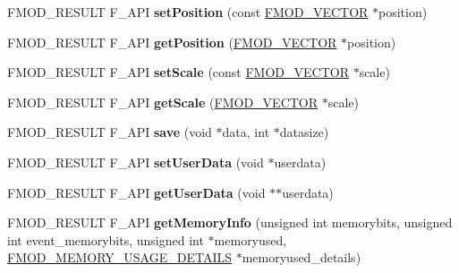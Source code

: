 \begin{DoxyCompactItemize}
\item 
F\+M\+O\+D\+\_\+\+R\+E\+S\+U\+LT F\+\_\+\+A\+PI {\bfseries set\+Position} (const \hyperlink{struct_f_m_o_d___v_e_c_t_o_r}{F\+M\+O\+D\+\_\+\+V\+E\+C\+T\+OR} $\ast$position)\hypertarget{class_f_m_o_d_1_1_geometry_a36ca90c62cbc0c37938a51750ce865e7}{}\label{class_f_m_o_d_1_1_geometry_a36ca90c62cbc0c37938a51750ce865e7}

\item 
F\+M\+O\+D\+\_\+\+R\+E\+S\+U\+LT F\+\_\+\+A\+PI {\bfseries get\+Position} (\hyperlink{struct_f_m_o_d___v_e_c_t_o_r}{F\+M\+O\+D\+\_\+\+V\+E\+C\+T\+OR} $\ast$position)\hypertarget{class_f_m_o_d_1_1_geometry_a2d0e4a6525b54cd9a39c447995eba296}{}\label{class_f_m_o_d_1_1_geometry_a2d0e4a6525b54cd9a39c447995eba296}

\item 
F\+M\+O\+D\+\_\+\+R\+E\+S\+U\+LT F\+\_\+\+A\+PI {\bfseries set\+Scale} (const \hyperlink{struct_f_m_o_d___v_e_c_t_o_r}{F\+M\+O\+D\+\_\+\+V\+E\+C\+T\+OR} $\ast$scale)\hypertarget{class_f_m_o_d_1_1_geometry_a46104dceeff4a02e5aae989f86951b2f}{}\label{class_f_m_o_d_1_1_geometry_a46104dceeff4a02e5aae989f86951b2f}

\item 
F\+M\+O\+D\+\_\+\+R\+E\+S\+U\+LT F\+\_\+\+A\+PI {\bfseries get\+Scale} (\hyperlink{struct_f_m_o_d___v_e_c_t_o_r}{F\+M\+O\+D\+\_\+\+V\+E\+C\+T\+OR} $\ast$scale)\hypertarget{class_f_m_o_d_1_1_geometry_a40f45f30258de49daf8bee7063afa9e9}{}\label{class_f_m_o_d_1_1_geometry_a40f45f30258de49daf8bee7063afa9e9}

\item 
F\+M\+O\+D\+\_\+\+R\+E\+S\+U\+LT F\+\_\+\+A\+PI {\bfseries save} (void $\ast$data, int $\ast$datasize)\hypertarget{class_f_m_o_d_1_1_geometry_a066a05c012e2d41f1ca929ab0328aa25}{}\label{class_f_m_o_d_1_1_geometry_a066a05c012e2d41f1ca929ab0328aa25}

\item 
F\+M\+O\+D\+\_\+\+R\+E\+S\+U\+LT F\+\_\+\+A\+PI {\bfseries set\+User\+Data} (void $\ast$userdata)\hypertarget{class_f_m_o_d_1_1_geometry_a9e7359878a030cf144cfdd773dfce85a}{}\label{class_f_m_o_d_1_1_geometry_a9e7359878a030cf144cfdd773dfce85a}

\item 
F\+M\+O\+D\+\_\+\+R\+E\+S\+U\+LT F\+\_\+\+A\+PI {\bfseries get\+User\+Data} (void $\ast$$\ast$userdata)\hypertarget{class_f_m_o_d_1_1_geometry_ab8502126a540d836f0fee179f2310c8f}{}\label{class_f_m_o_d_1_1_geometry_ab8502126a540d836f0fee179f2310c8f}

\item 
F\+M\+O\+D\+\_\+\+R\+E\+S\+U\+LT F\+\_\+\+A\+PI {\bfseries get\+Memory\+Info} (unsigned int memorybits, unsigned int event\+\_\+memorybits, unsigned int $\ast$memoryused, \hyperlink{struct_f_m_o_d___m_e_m_o_r_y___u_s_a_g_e___d_e_t_a_i_l_s}{F\+M\+O\+D\+\_\+\+M\+E\+M\+O\+R\+Y\+\_\+\+U\+S\+A\+G\+E\+\_\+\+D\+E\+T\+A\+I\+LS} $\ast$memoryused\+\_\+details)\hypertarget{class_f_m_o_d_1_1_geometry_a3dd06bc4077fac782ed5487c347ff14d}{}\label{class_f_m_o_d_1_1_geometry_a3dd06bc4077fac782ed5487c347ff14d}

\end{DoxyCompactItemize}


